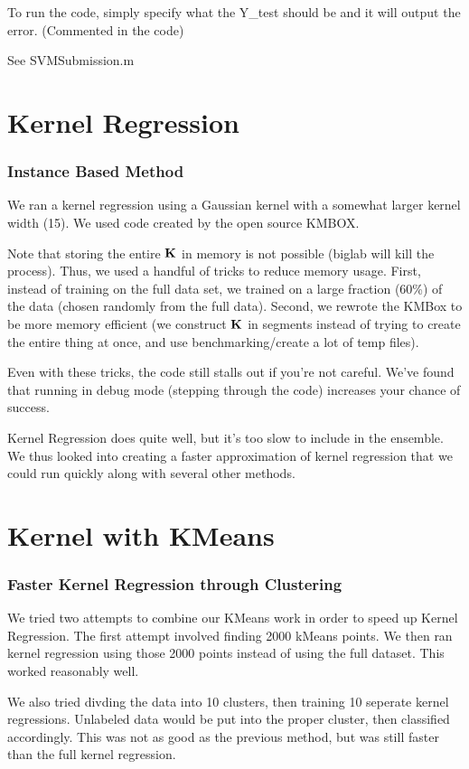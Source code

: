 \documentclass[a4paper,10pt]{article}
\begin{document}
To run the code, simply specify what the Y\_test should be and it will output the error. (Commented in the code)

See SVMSubmission.m

\section{Kernel Regression}
\subsubsection*{Instance Based Method}
We ran a kernel regression using a Gaussian kernel with a somewhat larger kernel width (15). We used code created by the open source KMBOX.
 
 Note that storing the entire $\bf{K}$ in memory is not possible (biglab will kill the process). Thus, we used a handful of tricks to reduce memory usage. First, instead of training on the full data set, we trained on a large fraction (60\%) of the data (chosen randomly from the full data). Second, we rewrote the KMBox to be more memory efficient (we construct $\bf{K}$ in segments instead of trying to create the entire thing at once, and use benchmarking/create a lot of temp files).
 
 Even with these tricks, the code still stalls out if you're not careful. We've found that running in debug mode (stepping through the code) increases your chance of success.
 
 Kernel Regression does quite well, but it's too slow to include in the ensemble. We thus looked into creating a faster approximation of kernel regression that we could run quickly along with several other methods.
 
 \section{Kernel with KMeans}
\subsubsection*{Faster Kernel Regression through Clustering}

We tried two attempts to combine our KMeans work in order to speed up Kernel Regression. The first attempt involved finding 2000 kMeans points. We then ran kernel regression using those 2000 points instead of using the full dataset. This worked reasonably well.

We also tried divding the data into 10 clusters, then training 10 seperate kernel regressions. Unlabeled data would be put into the proper cluster, then classified accordingly. This was not as good as the previous method, but was still faster than the full kernel regression.
 
\end{document}
